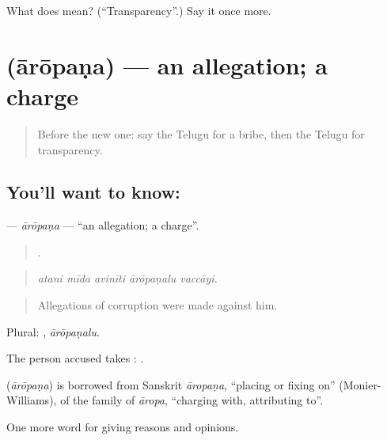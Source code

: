 \begin{tcolorbox}[breakable,colback=teal!4,colframe=teal!35!black,title={Before you move on}]
What does  mean? (\textquotedblleft{}Transparency\textquotedblright{}.) Say it once more.
\end{tcolorbox}
\section[\texorpdfstring{\te{ఆరోపణ} (ārōpaṇa)}{ఆరోపణ (ārōpaṇa)}]{ (ārōpaṇa) — an allegation; a charge}

\label{lesson:TE-C406-aropana}



\begin{quote}
Before the new one: say the Telugu for a bribe, then the Telugu for transparency.
\end{quote}

\subsection*{You'll want to know: }
\textbf{} — \emph{ārōpaṇa} — \textquotedblleft{}an allegation; a charge\textquotedblright{}.

\begin{quote}
    .
\end{quote}

\begin{quote}
\emph{atani mīda avinīti ārōpaṇalu vaccāyi.}
\end{quote}

\begin{quote}
Allegations of corruption were made against him.
\end{quote}

Plural: , \emph{ārōpaṇalu}.

The person accused takes :   .

\begin{cousinweb}
\textbf{} (\emph{ārōpaṇa}) is borrowed from Sanskrit \emph{āropaṇa}, \textquotedblleft{}placing or fixing on\textquotedblright{} (Monier-Williams), of the family of \emph{āropa}, \textquotedblleft{}charging with, attributing to\textquotedblright{}.
\end{cousinweb}

\begin{grammarlens}[title={What you've built}]
One more word for giving reasons and opinions.
\end{grammarlens}

